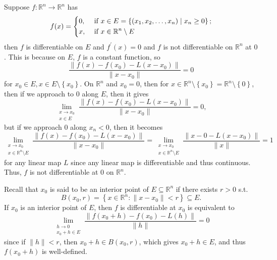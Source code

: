 \begin{eg}
Suppose \(f: \mathbb{R} ^n \to \mathbb{R} ^n\) has 
    \[
        f(x) = \begin{dcases}
            0, &\text{ if } x \in E = \left\{ (x_1, x_2, \dots , x_n) \mid x_n \ge 0 \right\}  ;\\
            x, &\text{ if } x \in \mathbb{R} ^n \setminus E
        \end{dcases}
    \]
then \(f\) is differentiable on \(E\) and \(f^{\prime} (x) = 0\) and \(f\) is not differentiable on \(\mathbb{R} ^n\) at \(0\). This is because on \(E\), \(f\) is a constant function, so 
\[
    \frac{\lVert f(x) - f(x_0) - L(x - x_0) \rVert }{\lVert x - x_0 \rVert } = 0
\]        
for \(x_0 \in E, x \in E \setminus \left\{ x_0 \right\} \). On \(\mathbb{R} ^n\) and \(x_0 = 0\), then for \(x \in \mathbb{R} ^n \setminus \left\{ x_0 \right\} = \mathbb{R} ^n \setminus \left\{ 0 \right\}  \), then if we approach to \(0\) along \(E\), then it gives 
\[
    \lim_{\substack{x \to x_0 \\ x \in E}}  \frac{\lVert f(x) - f(x_0) - L(x - x_0) \rVert }{\lVert x - x_0 \rVert } = 0,
\]      
but if we approach \(0\) along \(x_n < 0\), then it becomes 
\[
    \lim_{\substack{x \to x_0 \\ x \in \mathbb{R} ^n \setminus E}}  \frac{\lVert f(x) - f(x_0) - L(x - x_0) \rVert }{\lVert x - x_0 \rVert } = \lim_{\substack{x \to x_0 \\ x \in \mathbb{R} ^n \setminus E}} \frac{\lVert x - 0 - L(x - x_0) \rVert }{\lVert x \rVert } = 1
\]  
for any linear map \(L\) since any linear map is differentiable and thus continuous. Thus, \(f\) is not differentiable at \(0\) on \(\mathbb{R} ^n\).    
\end{eg}

\begin{remark} \label{rmk: interior point differentiable}
    Recall that \(x_0\) is said to be an interior point of \(E \subseteq \mathbb{R} ^n\) if there exists \(r > 0\) s.t. 
    \[
        B(x_0, r) = \left\{ x \in \mathbb{R} ^n : \lVert x - x_0 \rVert < r  \right\} \subseteq E. 
    \]   If \(x_0\) is an interior point of \(E\), then \(f\) is differentiable at \(x_0\) is equivalent to 
    \[
        \lim_{\substack{h \to 0 \\ x_0 + h \in E}} \frac{\left\lVert f(x_0+h) - f(x_0) - L(h) \right\rVert }{\lVert h \rVert } = 0 
    \]    
    since if \(\lVert h \rVert < r \), then \(x_0 + h \in B(x_0, r)\), which gives \(x_0 + h \in E\), and thus \(f(x_0 + h)\) is well-defined.      
\end{remark}

